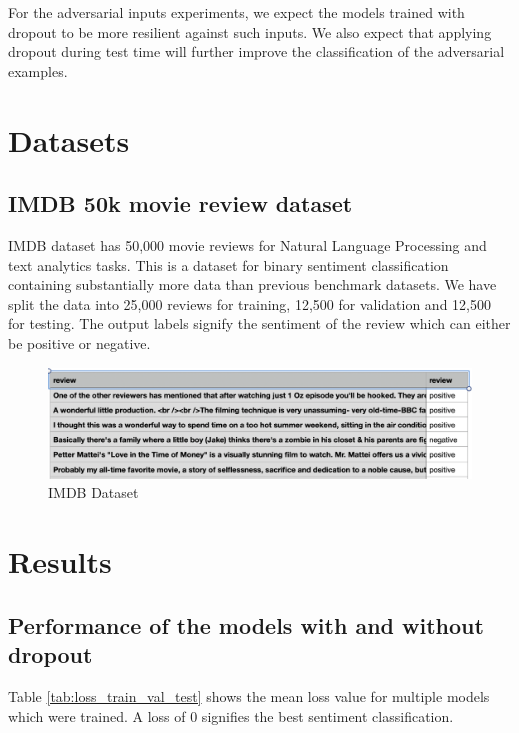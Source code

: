 \documentclass{article}
\begin{document}
For the adversarial inputs experiments, we expect the models trained with dropout to be more resilient against such inputs. We also expect that applying dropout during test time will further improve the classification of the adversarial examples.


\section{Datasets}
\subsection{IMDB 50k movie review dataset}
IMDB dataset has 50,000 movie reviews for Natural Language Processing and text analytics tasks. 
This is a dataset for binary sentiment classification containing substantially more data than previous benchmark datasets. We have split the data into 25,000 reviews for training, 12,500 for validation and 12,500 for testing. The output labels signify the sentiment of the review which can either be positive or negative.

\begin{figure}[h]
	\includegraphics[scale=0.5]{IMDBDataset.png}
	\centering
	\caption{IMDB Dataset}
	\label{fig:imdb_data}
\end{figure}

\section{Results}

\subsection{Performance of the models with and without dropout}
Table \ref{tab:loss_train_val_test} shows the mean loss value for multiple models which were trained. A loss of 0 signifies the best sentiment classification.
\end{document}
